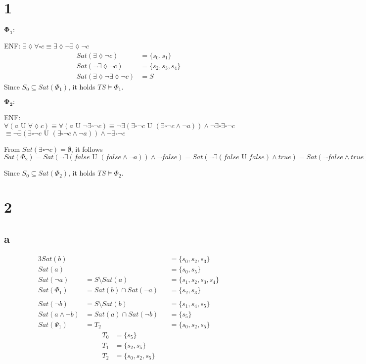 \documentclass[11pt]{article}
\begin{document}
\section{1}

$\mathbf{\Phi_1:}$

ENF: $\exists \lozenge \forall \square c
\equiv \exists \lozenge \lnot \exists \lozenge \lnot c$
\begin{align*}
    Sat(\exists \lozenge \lnot c) &= \{s_0, s_1\}\\
    Sat(\lnot \exists \lozenge \lnot c) &= \{s_2, s_3, s_4\}\\
    Sat(\exists \lozenge \lnot \exists \lozenge \lnot c) &= S
\end{align*}
Since $S_0 \subseteq Sat(\Phi_1)$, it holds $TS \models \Phi_1$.

$\mathbf{\Phi_2:}$

ENF: $\forall (a \text{ U } \forall \lozenge c)
\equiv \forall (a \text{ U } \lnot \exists \square \lnot c)
\equiv \lnot \exists (\exists \square \lnot c \text{ U } (\exists \square \lnot c \land \lnot a)) \land \lnot \exists \square \exists \square \lnot c$\\
$\equiv \lnot \exists (\exists \square \lnot c \text{ U } (\exists \square \lnot c \land \lnot a)) \land \lnot \exists \square \lnot c$

From $Sat(\exists \square \lnot c) = \emptyset$, it follows $Sat(\Phi_2) = Sat(\lnot \exists (false \text{ U } (false \land \lnot a)) \land \lnot false)
= Sat(\lnot \exists (false \text{ U } false) \land true)
= Sat(\lnot false \land true) = S$

Since $S_0 \subseteq Sat(\Phi_2)$, it holds $TS \models \Phi_2$.

\section{2}

\subsection{a}

\begin{alignat*}{3}
    Sat(b) & &&= \{s_0, s_2, s_3\}\\
    Sat(a) & &&= \{s_0, s_5\}\\
    Sat(\lnot a) &= S \setminus Sat(a) &&= \{s_1, s_2, s_3, s_4\}\\
    Sat(\Phi_1) &= Sat(b) \cap Sat(\lnot a) &&= \{s_2, s_3\}\\
    \\
    Sat(\lnot b) &= S \setminus Sat(b) &&= \{s_1, s_4, s_5\}\\
    Sat(a \land \lnot b) &= Sat(a) \cap Sat(\lnot b) &&= \{s_5\}\\
    Sat(\Psi_1) &= T_2 &&= \{s_0, s_2, s_5\}
\end{alignat*}
\begin{align*}
    T_0 &= \{s_5\}\\
    T_1 &= \{s_2, s_5\}\\
    T_2 &= \{s_0, s_2, s_5\}
\end{align*}
\end{document}
